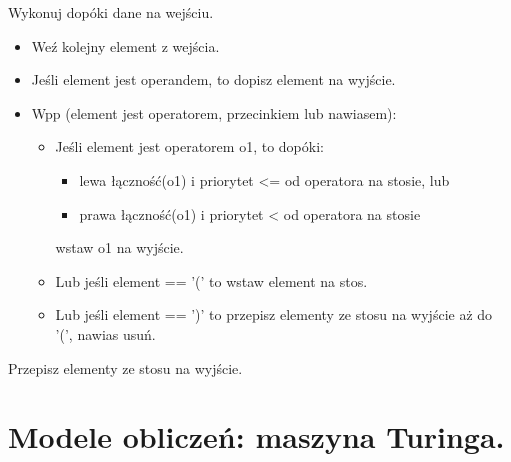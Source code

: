 \documentclass[main.tex]{subfiles}
\begin{document}
    Wykonuj dopóki dane na wejściu.
    \begin{itemize}[noitemsep]
        \item Weź kolejny element z wejścia.
        \item Jeśli element jest operandem, to dopisz element na wyjście.
        \item Wpp (element jest operatorem, przecinkiem lub nawiasem):
        \begin{itemize}
            \item Jeśli element jest operatorem o1, to dopóki:
            \begin{itemize}
                \item lewa łączność(o1) i priorytet <= od operatora na stosie, lub
                \item prawa łączność(o1) i priorytet < od operatora na stosie
            \end{itemize}
            wstaw o1 na wyjście.
            \item Lub jeśli element == '(' to wstaw element na stos.
            \item Lub jeśli element == ')' to przepisz elementy ze stosu na wyjście aż do '(', nawias usuń.
        \end{itemize}
    \end{itemize}
    Przepisz elementy ze stosu na wyjście.


    \section{Modele obliczeń: maszyna Turinga.}
\end{document}
